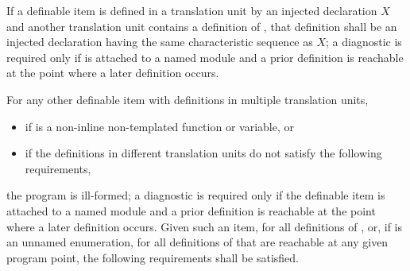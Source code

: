 \pnum
If a definable item  is defined in a translation unit
by an injected declaration $X$ and
another translation unit contains a definition of ,
that definition shall be an injected declaration
having the same characteristic sequence as $X$;
a diagnostic is required only if  is attached to a named module and
a prior definition is reachable at the point where a later definition occurs.

\pnum
For any other definable item  with definitions in multiple translation units,
\begin{itemize}
\item
if  is a non-inline non-templated function or variable, or
\item
if the definitions in different translation units
do not satisfy the following requirements,
\end{itemize}
the program is ill-formed;
a diagnostic is required only
if the definable item is attached to a named module and
a prior definition is reachable at the point where a later definition occurs.
Given such an item,
for all definitions of , or,
if  is an unnamed enumeration,
for all definitions of  that are reachable at any given program point,
the following requirements shall be satisfied.
